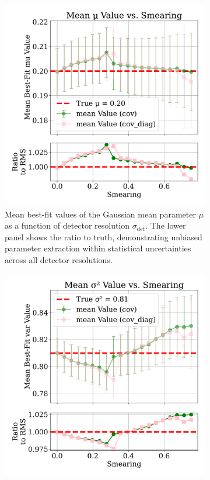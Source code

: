 \begin{figure}
    \centering
    \begin{subfigure}[t]{0.48\textwidth}
        \centering
        \includegraphics[width=\textwidth]{figures/chapter-07/mu_mean_values_with_errorbars_ratio.pdf}
        \caption{Mean best-fit values of the Gaussian mean parameter $\mu$ as a function of detector resolution $\sigma_{\text{det}}$.
        The lower panel shows the ratio to truth, demonstrating unbiased parameter extraction within statistical uncertainties across all detector resolutions.}
        \label{fig:mu_mean_values_with_errorbars}
    \end{subfigure}
    \hfill
    \begin{subfigure}[t]{0.48\textwidth}
        \centering
        \includegraphics[width=\textwidth]{figures/chapter-07/var_mean_values_with_errorbars_ratio.pdf}

\end{subfigure}
\end{figure}
